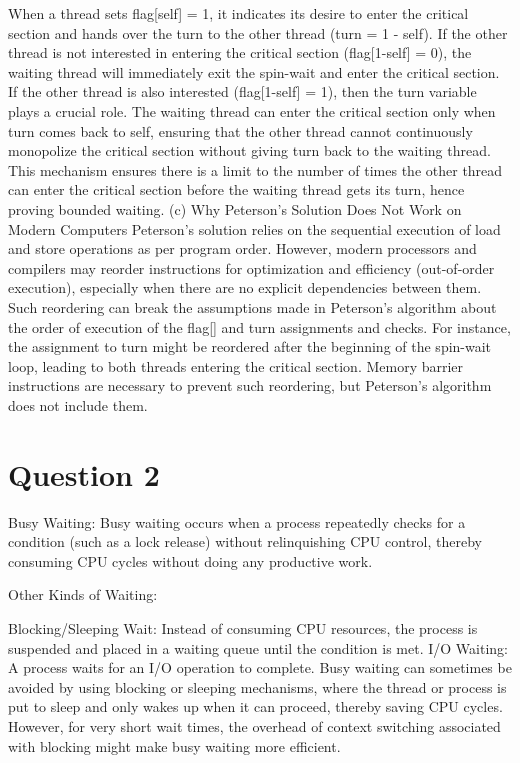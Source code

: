 \documentclass{article}
\begin{document}
When a thread sets flag[self] = 1, it indicates its desire to enter the critical section and hands over the turn to the other thread (turn = 1 - self).
If the other thread is not interested in entering the critical section (flag[1-self] = 0), the waiting thread will immediately exit the spin-wait and enter the critical section.
If the other thread is also interested (flag[1-self] = 1), then the turn variable plays a crucial role. The waiting thread can enter the critical section only when turn comes back to self, ensuring that the other thread cannot continuously monopolize the critical section without giving turn back to the waiting thread.
This mechanism ensures there is a limit to the number of times the other thread can enter the critical section before the waiting thread gets its turn, hence proving bounded waiting.\newline\newline
(c) Why Peterson’s Solution Does Not Work on Modern Computers
Peterson's solution relies on the sequential execution of load and store operations as per program order. However, modern processors and compilers may reorder instructions for optimization and efficiency (out-of-order execution), especially when there are no explicit dependencies between them. Such reordering can break the assumptions made in Peterson’s algorithm about the order of execution of the flag[] and turn assignments and checks. For instance, the assignment to turn might be reordered after the beginning of the spin-wait loop, leading to both threads entering the critical section. Memory barrier instructions are necessary to prevent such reordering, but Peterson's algorithm does not include them.

\section{Question 2}
Busy Waiting: Busy waiting occurs when a process repeatedly checks for a condition (such as a lock release) without relinquishing CPU control, thereby consuming CPU cycles without doing any productive work.\newline

Other Kinds of Waiting:\newline

Blocking/Sleeping Wait: Instead of consuming CPU resources, the process is suspended and placed in a waiting queue until the condition is met.
I/O Waiting: A process waits for an I/O operation to complete.
Busy waiting can sometimes be avoided by using blocking or sleeping mechanisms, where the thread or process is put to sleep and only wakes up when it can proceed, thereby saving CPU cycles. However, for very short wait times, the overhead of context switching associated with blocking might make busy waiting more efficient.
\end{document}
